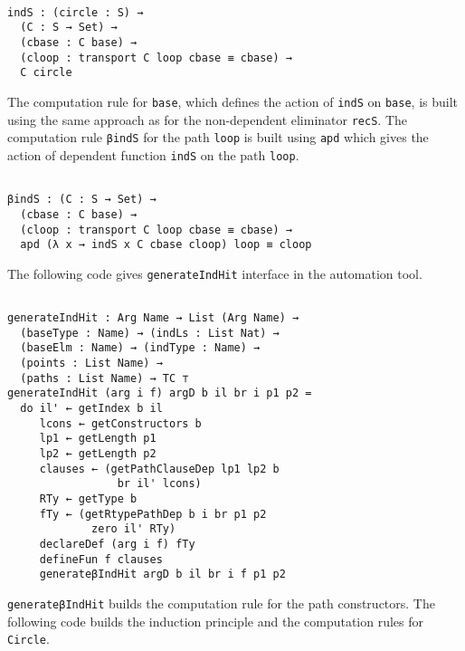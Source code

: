 \documentclass[sigplan,10pt]{acmart}
\begin{document}
\begin{center}
\begingroup
\begin{BVerbatim}

indS : (circle : S) → 
  (C : S → Set) →
  (cbase : C base) →
  (cloop : transport C loop cbase ≡ cbase) →
  C circle

\end{BVerbatim}
\endgroup
\end{center}

The computation rule for {\tt base}, which defines the action of {\tt indS} on {\tt base}, is built using the same approach as for the non-dependent eliminator {\tt recS}. The computation rule {\tt βindS} for the path {\tt loop} is built using {\tt apd} which gives the action of dependent function {\tt indS} on the path {\tt loop}.

\begin{center}
\begingroup
\begin{BVerbatim}

βindS : (C : S → Set) → 
  (cbase : C base) → 
  (cloop : transport C loop cbase ≡ cbase) → 
  apd (λ x → indS x C cbase cloop) loop ≡ cloop

\end{BVerbatim}
\endgroup
\end{center}      
      
The following code gives {\tt generateIndHit} interface in the automation tool.

\begin{center}
\begingroup
\begin{BVerbatim}

generateIndHit : Arg Name → List (Arg Name) →
  (baseType : Name) → (indLs : List Nat) →
  (baseElm : Name) → (indType : Name) →
  (points : List Name) → 
  (paths : List Name) → TC ⊤
generateIndHit (arg i f) argD b il br i p1 p2 =
  do il' ← getIndex b il
     lcons ← getConstructors b
     lp1 ← getLength p1
     lp2 ← getLength p2
     clauses ← (getPathClauseDep lp1 lp2 b 
                 br il' lcons)
     RTy ← getType b
     fTy ← (getRtypePathDep b i br p1 p2 
             zero il' RTy)
     declareDef (arg i f) fTy
     defineFun f clauses
     generateβIndHit argD b il br i f p1 p2

\end{BVerbatim}
\endgroup
\end{center}

{\tt generateβIndHit} builds the computation rule for the path constructors. The following code builds the induction principle and the computation rules for {\tt Circle}.
\end{document}
